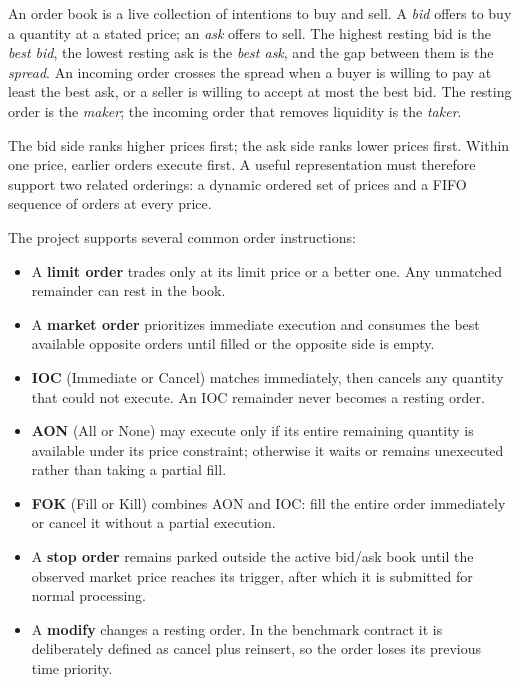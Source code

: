 \documentclass[10pt,twocolumn]{article}
\begin{document}
An order book is a live collection of intentions to buy and sell.  A \emph{bid}
offers to buy a quantity at a stated price; an \emph{ask} offers to sell.  The
highest resting bid is the \emph{best bid}, the lowest resting ask is the
\emph{best ask}, and the gap between them is the \emph{spread}.  An incoming
order crosses the spread when a buyer is willing to pay at least the best ask,
or a seller is willing to accept at most the best bid.  The resting order is the
\emph{maker}; the incoming order that removes liquidity is the \emph{taker}.

The bid side ranks higher prices first; the ask side ranks lower prices first.
Within one price, earlier orders execute first.  A useful representation must
therefore support two related orderings: a dynamic ordered set of prices and a
FIFO sequence of orders at every price.

The project supports several common order instructions:
\begin{itemize}
  \item A \textbf{limit order} trades only at its limit price or a better one.
        Any unmatched remainder can rest in the book.
  \item A \textbf{market order} prioritizes immediate execution and consumes the
        best available opposite orders until filled or the opposite side is
        empty.
  \item \textbf{IOC} (Immediate or Cancel) matches immediately, then cancels any
        quantity that could not execute.  An IOC remainder never becomes a
        resting order.
  \item \textbf{AON} (All or None) may execute only if its entire remaining
        quantity is available under its price constraint; otherwise it waits or
        remains unexecuted rather than taking a partial fill.
  \item \textbf{FOK} (Fill or Kill) combines AON and IOC: fill the entire order
        immediately or cancel it without a partial execution.
  \item A \textbf{stop order} remains parked outside the active bid/ask book
        until the observed market price reaches its trigger, after which it is
        submitted for normal processing.
  \item A \textbf{modify} changes a resting order.  In the benchmark contract it
        is deliberately defined as cancel plus reinsert, so the order loses its
        previous time priority.
\end{itemize}
\end{document}
